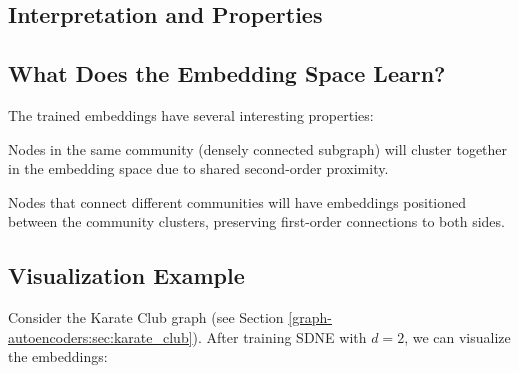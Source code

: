 \begin{notechapter}
\section{Interpretation and Properties}

\subsection{What Does the Embedding Space Learn?}

The trained embeddings have several interesting properties:

\begin{proposition}
Nodes in the same community (densely connected subgraph) will cluster together in the embedding space due to shared second-order proximity.
\end{proposition}

\begin{proposition}
Nodes that connect different communities will have embeddings positioned between the community clusters, preserving first-order connections to both sides.
\end{proposition}

\subsection{Visualization Example}

Consider the Karate Club graph (see Section \ref{graph-autoencoders:sec:karate_club}). After training SDNE with $d=2$, we can visualize the embeddings:

\begin{center}
\end{center}
\end{notechapter}
